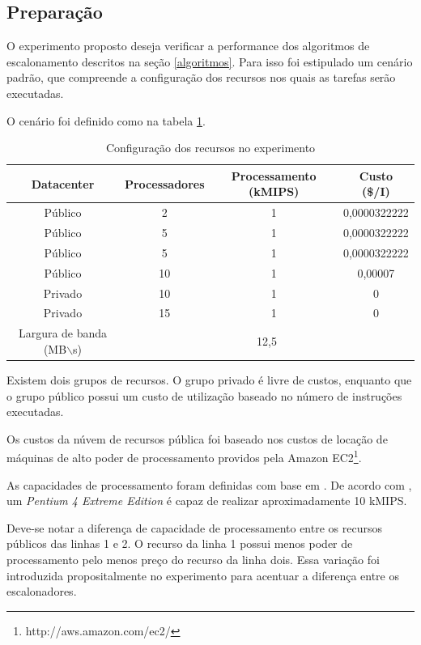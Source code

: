 \documentclass[a4paper,10pt]{article}
\begin{document}
\subsection{Preparação}

O experimento proposto deseja verificar a performance dos algoritmos de escalonamento
descritos na seção \ref{algoritmos}. Para isso foi estipulado um cenário padrão, que
compreende a configuração dos recursos nos quais as tarefas serão executadas.

O cenário foi definido como na tabela \ref{tab:datacenter}.

\begin{table}
\centering

  \begin{tabular}{|c|c|c|c|}  
    \hline
    Datacenter & Processadores & Processamento (kMIPS) & Custo (\$/I) \\
    \hline
    Público & 2 & 1 & 0,0000322222 \\
    \hline
    Público & 5 & 1 & 0,0000322222 \\
    \hline
    Público & 5 & 1 & 0,0000322222 \\
    \hline
    Público & 10 & 1 & 0,00007 \\
    \hline
    Privado & 10 & 1 & 0 \\
    \hline
    Privado & 15 & 1 & 0 \\
    \hline
    \hline
    Largura de banda (MB$\backslash$s)& \multicolumn{3}{|c|}{12,5} \\
    \hline

  \end{tabular}
  \caption{Configuração dos recursos no experimento}
  \label{tab:datacenter}
\end{table}

Existem dois grupos de recursos. O grupo privado é livre de custos, enquanto que o grupo público possui
um custo de utilização baseado no número de instruções executadas. 

Os custos da núvem de recursos pública foi baseado nos custos de locação de máquinas de alto poder de
processamento providos pela Amazon EC2\footnote{http://aws.amazon.com/ec2/}.

As capacidades de processamento foram definidas com base em \cite{ips_wiki}. De acordo com \cite{ips_wiki},
um \emph{Pentium 4 Extreme Edition} é capaz de realizar aproximadamente 10 kMIPS.

Deve-se notar a diferença de capacidade de processamento entre os recursos públicos das linhas 1 e 2.
O recurso da linha 1 possui menos poder de processamento pelo menos preço do recurso da linha dois. Essa
variação foi introduzida propositalmente no experimento para acentuar a diferença entre os escalonadores.
\end{document}
